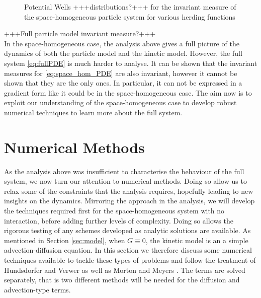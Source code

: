 \documentclass[11pt, a4paper, draft]{article}
\begin{document}
        \begin{figure}[h!]
            \centering
            \caption{Potential Wells +++distributions?+++ for the invariant measure of the space-homogeneous particle system for various herding functions}
            \label{fig:space_hom_particle_measure}
        \end{figure}
        +++Full particle model invariant measure?+++\\
        In the space-homogeneous case, the analysis above gives a full picture of the dynamics of both the particle model and the kinetic model. However, the full system \eqref{eq:fullPDE} is much harder to analyse. It can be shown that the invariant measures for \eqref{eq:space_hom_PDE} are also invariant, however it cannot be shown that they are the only ones. In particular, it can not be expressed in a gradient form like it could be in the space-homogeneous case. The aim now is to exploit our understanding of the space-homogeneous case to develop robust numerical techniques to learn more about the full system.
        
                
	\section{Numerical Methods}
		As the analysis above was insufficient to characterise the behaviour of the full system, we now turn our attention to numerical methods. Doing so allow us to relax some of the constraints that the analysis requires, hopefully leading to new insights on the dynamics. Mirroring the approach in the analysis, we will develop the techniques required first for the space-homogeneous system with no interaction, before adding further levels of complexity. Doing so allows the rigorous testing of any schemes developed as analytic solutions are available. As mentioned in Section \ref{sec:model}, when $G\equiv0$, the kinetic model is an a simple advection-diffusion equation. In this section we therefore discuss some numerical techniques available to tackle these types of problems and follow the treatment of Hundsdorfer and Verwer as well as Morton and Meyers \cite{Hundsdorfer2007, Morton2005}. The terms are solved separately, that is two different methods will be needed for the diffusion and advection-type terms. 
        
\end{document}
